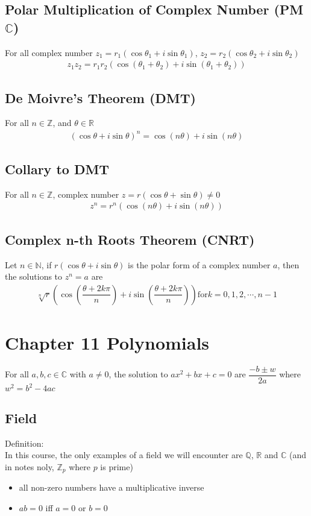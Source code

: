 \documentclass[12pt, letterpaper]{article}
\begin{document}
\subsection{Polar Multiplication of Complex Number (PM$\mathbb{C}$)}
For all complex number $z_1 = r_1(\cos\theta_1 + i\sin\theta_1)$, $z_2 = r_2(\cos\theta_2 + i\sin\theta_2)$
\begin{align*}
    z_1z_2 = r_1r_2(\cos(\theta_1 + \theta_2) + i\sin(\theta_1 + \theta_2))
\end{align*}
\subsection{De Moivre's Theorem (DMT)}
For all $n \in \mathbb{Z}$, and $\theta \in \mathbb{R}$
\begin{align*}
    (\cos\theta + i\sin\theta)^n = \cos (n\theta) + i \sin (n\theta)
\end{align*}
\subsection{Collary to DMT}
For all $n \in \mathbb{Z}$, complex number $z = r(\cos\theta + \sin\theta) \neq 0$
\begin{align*}
    z^n = r^n (\cos (n\theta) + i \sin (n\theta))
\end{align*}
\subsection{Complex n-th Roots Theorem (CNRT)}
Let $n \in \mathbb{N}$, if $r(\cos\theta + i\sin\theta)$ is the polar form of a complex number $a$, then the solutions to $z^n = a$ are 
\begin{align*}
    \sqrt[n]{r}(\cos(\dfrac{\theta + 2k\pi}{n}) + i\sin(\dfrac{\theta + 2k\pi}{n})) \text{for} k = 0, 1, 2, \cdots, n-1
\end{align*}

\section{Chapter 11 Polynomials}
For all $a,b,c \in \mathbb{C}$ with $a \neq 0$, the solution to $ax^2 + bx + c = 0$ are $\dfrac{-b \pm w}{2a}$ where $w^2 = b^2 - 4ac$
\subsection{Field}
Definition: \\
In this course, the only examples of a field we will encounter are $\mathbb{Q}$, $\mathbb{R}$ and $\mathbb{C}$ (and in notes noly, $\mathbb{Z}_p$ where $p$ is prime)
\begin{itemize}
    \item all non-zero numbers have a multiplicative inverse 
    \item $ab = 0$ iff $a=0$ or $b=0$
\end{itemize}
\end{document}
